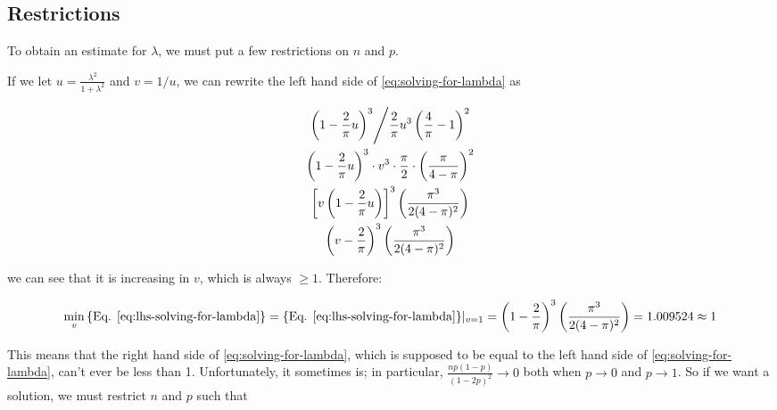 \documentclass{article}
\begin{document}

\subsection{Restrictions}

To obtain an estimate for $\lambda$, we must put a few restrictions on $n$ and
$p$.

If we let $u = \frac{\lambda^2}{1+\lambda^2}$ and $v = 1/u$, we can rewrite the
left hand side of \eqref{eq:solving-for-lambda} as

\begin{gather}
  \left. \left( 1 - \frac{2}{\pi} u \right)^3 \middle/ \frac{2}{\pi} u^3 \left( \frac{4}{\pi} - 1 \right)^2 \right. \nonumber \\
  \left( 1 - \frac{2}{\pi} u \right)^3 \cdot v^3 \cdot \frac{\pi}{2} \cdot \left( \frac{\pi}{4-\pi} \right)^2 \nonumber \\
  \left[ v \left( 1 - \frac{2}{\pi} u \right) \right]^3 \left( \frac{\pi^3}{2(4-\pi)^2} \right) \nonumber \\
  \left( v - \frac{2}{\pi} \right)^3 \left( \frac{\pi^3}{2(4-\pi)^2} \right) \label{eq:lhs-solving-for-lambda}
\end{gather}

we can see that it is increasing in $v$, which is always $\geq 1$. Therefore:

\begin{equation}
  \min_{v} \textnormal{\{Eq. \ref{eq:lhs-solving-for-lambda}\}} = \textnormal{\{Eq. \ref{eq:lhs-solving-for-lambda}\}} |_{v=1} = 
  \left( 1 - \frac{2}{\pi} \right)^3 \left( \frac{\pi^3}{2(4-\pi)^2} \right) = 1.009524 \approx 1
\end{equation}

This means that the right hand side of \eqref{eq:solving-for-lambda}, which is
supposed to be equal to the left hand side of \eqref{eq:solving-for-lambda},
can't ever be less than 1. Unfortunately, it sometimes is; in particular,
$\frac{np(1-p)}{(1-2p)^2} \to 0$ both when $p \to 0$ and $p \to 1$. So if we
want a solution, we must restrict $n$ and $p$ such that
\end{document}
